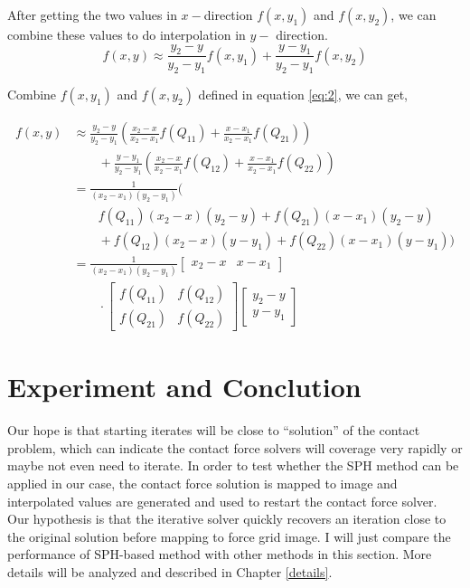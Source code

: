     After getting the two values in $x-$direction $f(x, y_1)$ and $f(x, y_2)$, we can combine these values to do interpolation in $y-$ direction.
    \begin{equation}
        f(x,y) \approx {\frac {y_{2}-y}{y_{2}-y_{1}}}f(x,y_{1})+{\frac {y-y_{1}}{y_{2}-y_{1}}}f(x,y_{2})
    \end{equation}

    Combine $f(x, y_1)$ and $f(x, y_2)$ defined in equation \ref{eq:2}, we can get,

    \begin{equation}
        \begin{aligned}
        f(x,y)&\approx{\frac {y_{2}-y}{y_{2}-y_{1}}}\left({\frac {x_{2}-x}{x_{2}-x_{1}}}f(Q_{11})+{\frac {x-x_{1}}{x_{2}-x_{1}}}f(Q_{21})\right)\\&\qquad+{\frac {y-y_{1}}{y_{2}-y_{1}}}\left({\frac {x_{2}-x}{x_{2}-x_{1}}}f(Q_{12})+{\frac {x-x_{1}}{x_{2}-x_{1}}}f(Q_{22})\right)\\&={\frac {1}{(x_{2}-x_{1})(y_{2}-y_{1})}}{\big (}\\&\qquad f(Q_{11})(x_{2}-x)(y_{2}-y)+f(Q_{21})(x-x_{1})(y_{2}-y)\\&\qquad+f(Q_{12})(x_{2}-x)(y-y_{1})+f(Q_{22})(x-x_{1})(y-y_{1}){\big )}\\&={\frac {1}{(x_{2}-x_{1})(y_{2}-y_{1})}}{\begin{bmatrix}x_{2}-x&x-x_{1}\end{bmatrix}}\\&\qquad \cdot {\begin{bmatrix}f(Q_{11})&f(Q_{12})\\f(Q_{21})&f(Q_{22})\end{bmatrix}}{\begin{bmatrix}y_{2}-y\\y-y_{1}\end{bmatrix}}
        \end{aligned}
        \label{interpolation}
    \end{equation}

\section{Experiment and Conclution}
    \label{sec:sph-exp}
    Our hope is that starting iterates will be close to ``solution'' of the contact problem, which can indicate the contact force solvers will coverage very rapidly or maybe not even need to iterate. In order to test whether the SPH method can be applied in our case, the contact force solution is mapped to image and interpolated values are generated and used to restart the contact force solver. Our hypothesis is that the iterative solver quickly recovers an iteration close to the original solution before mapping to force grid image. I will just compare the performance of SPH-based method with other methods in this section. More details will be analyzed and described in Chapter \ref{details}.

